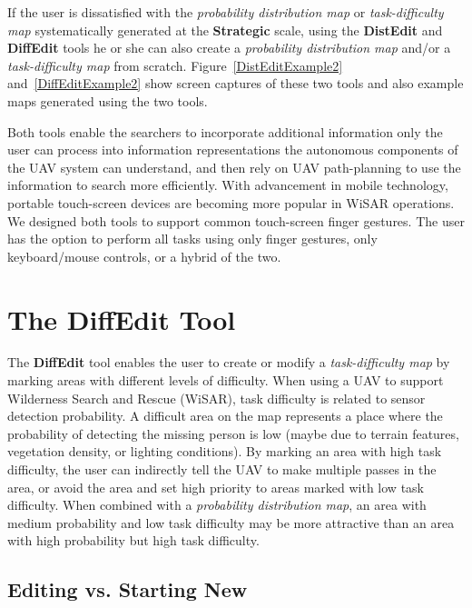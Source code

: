 If the user is dissatisfied with the \textit{probability distribution map} or \textit{task-difficulty map} systematically generated at the \textbf{Strategic} scale, using the \textbf{DistEdit} and \textbf{DiffEdit} tools he or she can also create a \textit{probability distribution map} and/or a \textit{task-difficulty map} from scratch. Figure~\ref{DistEditExample2} and~\ref{DiffEditExample2} show screen captures of these two tools and also example maps generated using the two tools.

Both tools enable the searchers to incorporate additional information only the user can process into information representations the autonomous components of the UAV system can understand, and then rely on UAV path-planning to use the information to search more efficiently. With advancement in mobile technology, portable touch-screen devices are becoming more popular in WiSAR operations. We designed both tools to support common touch-screen finger gestures. The user has the option to perform all tasks using only finger gestures, only keyboard/mouse controls, or a hybrid of the two.

\section{The DiffEdit Tool}
\label{DiffEdit}

The \textbf{DiffEdit} tool enables the user to create or modify a \textit{task-difficulty map} by marking areas with different levels of difficulty. When using a UAV to support Wilderness Search and Rescue (WiSAR), task difficulty is related to sensor detection probability. A difficult area on the map represents a place where the probability of detecting the missing person is low (maybe due to terrain features, vegetation density, or lighting conditions). By marking an area with high task difficulty, the user can indirectly tell the UAV to make multiple passes in the area, or avoid the area and set high priority to areas marked with low task difficulty. When combined with a \textit{probability distribution map}, an area with medium probability and low task difficulty may be more attractive than an area with high probability but high task difficulty.

\subsection{Editing vs. Starting New}

